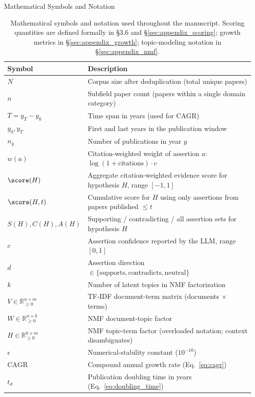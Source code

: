 \documentclass[
  ignorenonframetext,
]{beamer}
\begin{document}
\begin{frame}[allowframebreaks]{Mathematical Symbols and Notation}
\begin{table}[H]
\centering
\caption{Mathematical symbols and notation used throughout the manuscript. Scoring quantities are defined formally in \S3.6 and \S\ref{sec:appendix_scoring}; growth metrics in \S\ref{sec:appendix_growth}; topic-modeling notation in \S\ref{sec:appendix_nmf}.}
\label{tab:notation_symbols}
\begin{tabular}{ll}
\toprule
\textbf{Symbol} & \textbf{Description} \\
\midrule
$N$ & Corpus size after deduplication (total unique papers) \\
$n$ & Subfield paper count (papers within a single domain category) \\
$T = y_T - y_0$ & Time span in years (used for CAGR) \\
$y_0, y_T$ & First and last years in the publication window \\
$n_y$ & Number of publications in year $y$ \\
$w(a)$ & Citation-weighted weight of assertion $a$: $\log(1 + \text{citations}) \cdot c$ \\
$\score(H)$ & Aggregate citation-weighted evidence score for hypothesis $H$, range $[-1, 1]$ \\
$\score(H, t)$ & Cumulative score for $H$ using only assertions from papers published $\leq t$ \\
$S(H), C(H), A(H)$ & Supporting / contradicting / all assertion sets for hypothesis $H$ \\
$c$ & Assertion confidence reported by the LLM, range $[0, 1]$ \\
$d$ & Assertion direction $\in \{\text{supports}, \text{contradicts}, \text{neutral}\}$ \\
$k$ & Number of latent topics in NMF factorization \\
$V \in \mathbb{R}^{n \times m}_{\geq 0}$ & TF-IDF document-term matrix (documents $\times$ terms) \\
$W \in \mathbb{R}^{n \times k}_{\geq 0}$ & NMF document-topic factor \\
$H \in \mathbb{R}^{k \times m}_{\geq 0}$ & NMF topic-term factor (overloaded notation; context disambiguates) \\
$\epsilon$ & Numerical-stability constant ($10^{-10}$) \\
$\text{CAGR}$ & Compound annual growth rate (Eq.~\ref{eq:cagr}) \\
$t_d$ & Publication doubling time in years (Eq.~\ref{eq:doubling_time}) \\

\end{tabular}
\end{table}
\end{frame}
\end{document}
